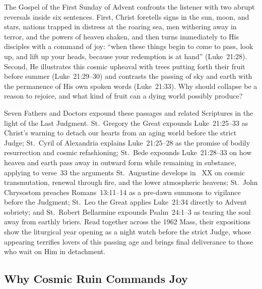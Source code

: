 
The Gospel of the First Sunday of Advent confronts the listener with two abrupt reversals inside six sentences. First, Christ foretells signs in the sun, moon, and stars, nations trapped in distress at the roaring sea, men withering away in terror, and the powers of heaven shaken, and then turns immediately to His disciples with a command of joy: ``when these things begin to come to pass, look up, and lift up your heads, because your redemption is at hand'' (Luke~21:28). Second, He illustrates this cosmic upheaval with trees putting forth their fruit before summer (Luke~21:29--30) and contrasts the passing of sky and earth with the permanence of His own spoken words (Luke~21:33). Why should collapse be a reason to rejoice, and what kind of fruit can a dying world possibly produce?

Seven Fathers and Doctors expound these passages and related Scriptures in the light of the Last Judgment. St.~Gregory the Great expounds Luke~21:25--33 as Christ's warning to detach our hearts from an aging world before the strict Judge; St.~Cyril of Alexandria explains Luke~21:25--28 as the promise of bodily resurrection and cosmic refashioning; St.~Bede expounds Luke~21:28--33 on how heaven and earth pass away in outward form while remaining in substance, applying to verse~33 the arguments St.~Augustine develops in ~XX on cosmic transmutation, renewal through fire, and the lower atmospheric heavens; St.~John Chrysostom preaches Romans~13:11--14 as a pre-dawn summons to vigilance before the Judgment; St.~Leo the Great applies Luke~21:34 directly to Advent sobriety; and St.~Robert Bellarmine expounds Psalm~24:1--3 as tearing the soul away from earthly briers. Read together across the 1962 Mass, their expositions show the liturgical year opening as a night watch before the strict Judge, whose appearing terrifies lovers of this passing age and brings final deliverance to those who wait on Him in detachment.

\subsection{Why Cosmic Ruin Commands Joy}

